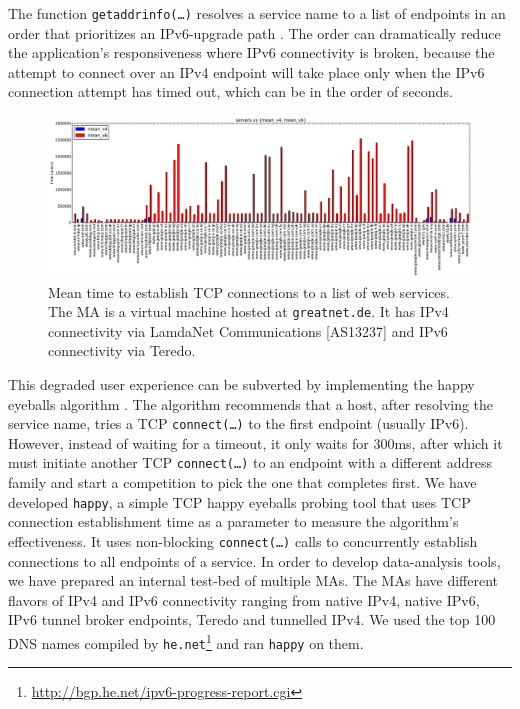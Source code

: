 The function \texttt{getaddrinfo(\ldots)} resolves a service name to a list of
endpoints in an order that prioritizes an IPv6-upgrade path \cite{rfc6724}.
The order can dramatically reduce the application's responsiveness where IPv6
connectivity is broken, because the attempt to connect over an IPv4 endpoint
will take place only when the IPv6 connection attempt has timed out, which can
be in the order of seconds.

\begin{figure}[t]
\centering
\includegraphics[width=1.0\textwidth]{figures/t28972-mean}
\caption{Mean time to establish TCP connections to a list of web services. The
\ac{MA} is a virtual machine hosted at \texttt{greatnet.de}. It has IPv4
connectivity via LamdaNet Communications [AS13237] and IPv6 connectivity via
Teredo.}
\label{fig:t28972-mean}
\end{figure}

This degraded user experience can be subverted by implementing the happy
eyeballs algorithm \cite{rfc6555}. The algorithm recommends that a host, after
resolving the service name, tries a TCP \texttt{connect(\ldots)} to the first
endpoint (usually IPv6). However, instead of waiting for a timeout, it only
waits for 300ms, after which it must initiate another TCP
\texttt{connect(\ldots)} to an endpoint with a different address family and
start a competition to pick the one that completes first. We have developed
\texttt{happy}, a simple TCP happy eyeballs probing tool that uses TCP
connection establishment time as a parameter to measure the algorithm's
effectiveness. It uses non-blocking \texttt{connect(\ldots)} calls to
concurrently establish connections to all endpoints of a service. In order to
develop data-analysis tools, we have prepared an internal test-bed of multiple
\ac{MA}s. The \ac{MA}s have different flavors of IPv4 and IPv6 connectivity
ranging from native IPv4, native IPv6, IPv6 tunnel broker endpoints, Teredo
and tunnelled IPv4. We used the top 100 DNS names compiled by
\texttt{he.net}\footnote{\url{http://bgp.he.net/ipv6-progress-report.cgi}} and
ran \texttt{happy} on them.

